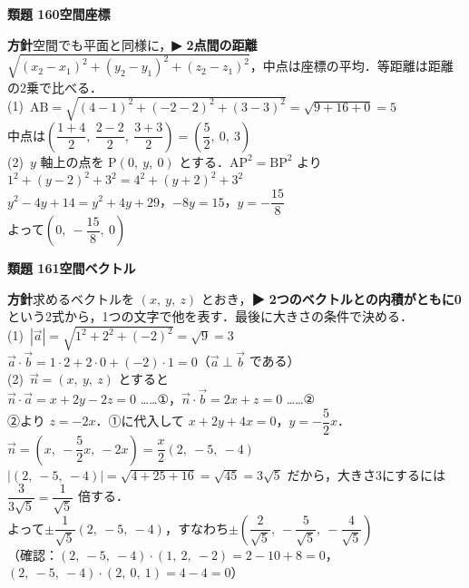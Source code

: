 \documentclass[a4paper,11pt]{ltjsarticle}
\newcommand{\ans}[2]{\Needspace{5\baselineskip}\vspace{6pt}%
  {\sffamily\bfseries 類題 #1\quad #2}\par}
\newcommand{\point}[1]{\textsf{\bfseries ▶ #1}}
\begin{document}
\ans{160}{空間座標}
\begin{kai}
\textbf{方針}\quad 空間でも平面と同様に，\point{2点間の距離 $\sqrt{(x_2-x_1)^2+(y_2-y_1)^2+(z_2-z_1)^2}$}，中点は座標の平均．等距離は距離の2乗で比べる．\\[2pt]
(1)\ $\mathrm{AB}=\sqrt{(4-1)^2+(-2-2)^2+(3-3)^2}=\sqrt{9+16+0}=5$\\
\hspace*{1.5em}中点は\quad $\left(\dfrac{1+4}2,\ \dfrac{2-2}2,\ \dfrac{3+3}2\right)=\left(\dfrac52,\ 0,\ 3\right)$\\[2pt]
(2)\ $y$ 軸上の点を $\mathrm P(0,\ y,\ 0)$ とする．$\mathrm{AP}^2=\mathrm{BP}^2$ より\\
\hspace*{1.5em}$1^2+(y-2)^2+3^2=4^2+(y+2)^2+3^2$\\
\hspace*{1.5em}$y^2-4y+14=y^2+4y+29$，\quad $-8y=15$，\quad $y=-\dfrac{15}8$\\
\hspace*{1.5em}よって\quad $\left(0,\ -\dfrac{15}8,\ 0\right)$
\end{kai}

\ans{161}{空間ベクトル}
\begin{kai}
\textbf{方針}\quad 求めるベクトルを $(x,\ y,\ z)$ とおき，\point{2つのベクトルとの内積がともに0}という2式から，1つの文字で他を表す．最後に大きさの条件で決める．\\[2pt]
(1)\ $|\vec a|=\sqrt{1^2+2^2+(-2)^2}=\sqrt9=3$\\
\hspace*{1.5em}$\vec a\cdot\vec b=1\cdot2+2\cdot0+(-2)\cdot1=0$\quad （$\vec a\perp\vec b$ である）\\[2pt]
(2)\ $\vec n=(x,\ y,\ z)$ とすると\\
\hspace*{1.5em}$\vec n\cdot\vec a=x+2y-2z=0$ ……①，\quad $\vec n\cdot\vec b=2x+z=0$ ……②\\
\hspace*{1.5em}②より $z=-2x$．①に代入して $x+2y+4x=0$，$y=-\dfrac52x$．\\
\hspace*{1.5em}$\vec n=\left(x,\ -\dfrac52x,\ -2x\right)=\dfrac x2(2,\ -5,\ -4)$\\
\hspace*{1.5em}$|(2,\ -5,\ -4)|=\sqrt{4+25+16}=\sqrt{45}=3\sqrt5$ だから，大きさ3にするには $\dfrac{3}{3\sqrt5}=\dfrac1{\sqrt5}$ 倍する．\\
\hspace*{1.5em}よって\quad $\pm\dfrac{1}{\sqrt5}(2,\ -5,\ -4)$，すなわち\quad $\pm\left(\dfrac{2}{\sqrt5},\ -\dfrac{5}{\sqrt5},\ -\dfrac{4}{\sqrt5}\right)$\\
\hspace*{1.5em}（確認：$(2,\ -5,\ -4)\cdot(1,\ 2,\ -2)=2-10+8=0$，$(2,\ -5,\ -4)\cdot(2,\ 0,\ 1)=4-4=0$）
\end{kai}
\end{document}
